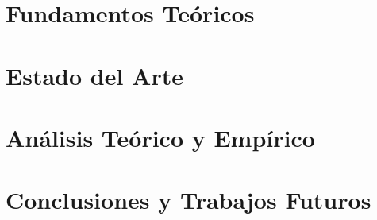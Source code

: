 \documentclass[print, color]{ugrTFG}
\let\cleardoublepage\clearpage
\begin{document}
\maketitle

\frontmatter %

   


                    

            
               


\mainmatter %

\part{Fundamentos Teóricos}



\part{Estado del Arte}


\part{Análisis Teórico y Empírico}



\part{Conclusiones y Trabajos Futuros}



% 
\end{document}
